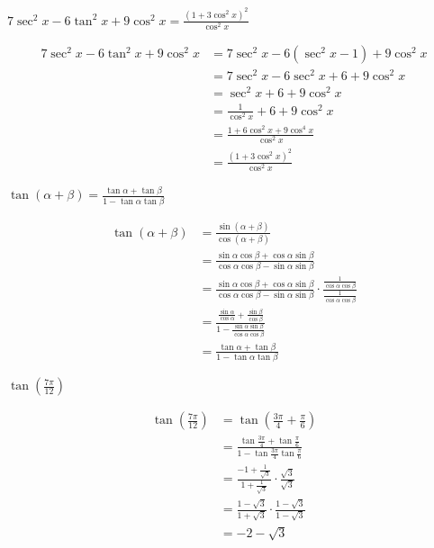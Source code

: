 \documentclass{exam}
\begin{document}
\begin{questions}
\question $\displaystyle 7\sec^2 x-6\tan^2x+9\cos^2x=\frac{\left(1+3\cos^2x\right)^2}{\cos^2x}$
\begin{solution}
\begin{align*}
7\sec^2 x-6\tan^2x+9\cos^2x&=7\sec^2 x-6(\sec^2 x-1)+9\cos^2x\\
&=7\sec^2 x-6\sec^2 x+6+9\cos^2x\\
&=\sec^2 x+6+9\cos^2x\\
&=\frac{1}{\cos^2 x}+6+9\cos^2x\\
&=\frac{1+6\cos^2 x+9\cos^4 x}{\cos^2 x}\\
&=\frac{(1+3\cos^2 x)^2}{\cos^2 x}
\end{align*}
\end{solution}

\question $\displaystyle\tan(\alpha+\beta)=\frac{\tan\alpha+\tan\beta}{1-\tan\alpha\tan\beta}$
\begin{solution}
\begin{align*}
\tan(\alpha+\beta)&=\frac{\sin(\alpha+\beta)}{\cos(\alpha+\beta)}\\
&=\frac{\sin\alpha\cos\beta+\cos\alpha\sin\beta}{\cos\alpha\cos\beta-\sin\alpha\sin\beta}\\
&=\frac{\sin\alpha\cos\beta+\cos\alpha\sin\beta}{\cos\alpha\cos\beta-\sin\alpha\sin\beta}\cdot\frac{\frac{1}{\cos\alpha\cos\beta}}{\frac{1}{\cos\alpha\cos\beta}}\\
&=\frac{\frac{\sin\alpha}{\cos\alpha}+\frac{\sin\beta}{\cos\beta}}{1-\frac{\sin\alpha\sin\beta}{\cos\alpha\cos\beta}}\\
&=\frac{\tan\alpha+\tan\beta}{1-\tan\alpha\tan\beta}
\end{align*}
\end{solution}

\question $\displaystyle\tan\left(\frac{7\pi}{12}\right)$
\begin{solution}
\begin{align*}
\tan\left(\frac{7\pi}{12}\right)&=\tan\left(\frac{3\pi}{4}+\frac{\pi}{6}\right)\\
&=\frac{\tan\frac{3\pi}{4}+\tan\frac{\pi}{6}}{1-\tan\frac{3\pi}{4}\tan\frac{\pi}{6}}\\
&=\frac{-1+\frac{1}{\sqrt{3}}}{1+\frac{1}{\sqrt{3}}}\cdot\frac{\sqrt{3}}{\sqrt{3}}\\
&=\frac{1-\sqrt{3}}{1+\sqrt{3}}\cdot\frac{1-\sqrt{3}}{1-\sqrt{3}}\\
&=-2-\sqrt{3}
\end{align*}
\end{solution}


\end{questions}
\end{document}
